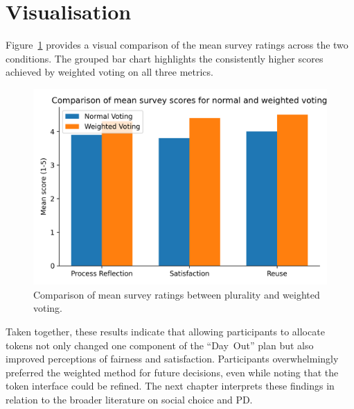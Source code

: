 \section{Visualisation}

Figure~\ref{fig:bar-comparison} provides a visual comparison of the mean survey ratings across the two conditions.  The grouped bar chart highlights the consistently higher scores achieved by weighted voting on all three metrics.

\begin{figure}[h]
    \centering
    \includegraphics[width=0.8\linewidth]{imgs/token_comparison_chart.png}
    \caption{Comparison of mean survey ratings between plurality and weighted voting.  }
    \label{fig:bar-comparison}
\end{figure}

Taken together, these results indicate that allowing participants to allocate tokens not only changed one component of the ``Day~Out'' plan but also improved perceptions of fairness and satisfaction.  Participants overwhelmingly preferred the weighted method for future decisions, even while noting that the token interface could be refined.  The next chapter interprets these findings in relation to the broader literature on social choice and PD.